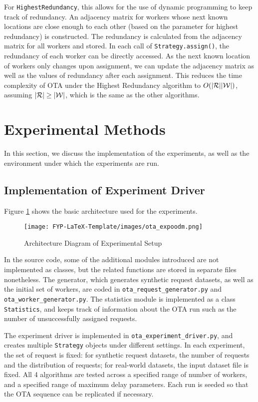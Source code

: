 \documentclass[urop]{socreport}
\begin{document}
For \verb|HighestRedundancy|, this allows for the use of dynamic programming to keep track of redundancy. An adjacency matrix for workers whose next known locations are close enough to each other (based on the parameter for highest redundancy) is constructed. The redundancy is calculated from the adjacency matrix for all workers and stored. In each call of \verb|Strategy.assign()|, the redundancy of each worker can be directly accessed. As the next known location of workers only changes upon assignment, we can update the adjacency matrix as well as the values of redundancy after each assignment. This reduces the time complexity of OTA under the Highest Redundancy algorithm to $O(|\mathcal{R}||\mathcal{W}|)$, assuming $|\mathcal{R}| \geq |\mathcal{W}|$, which is the same as the other algorithms.

\section{Experimental Methods}
In this section, we discuss the implementation of the experiments, as well as the environment under which the experiments are run.

\subsection{Implementation of Experiment Driver}
Figure \ref{fig:expdiag} shows the basic architecture used for the experiments. 

\begin{figure}[h]
    \centering
    \texttt{[image: FYP-LaTeX-Template/images/ota\_expoodm.png]}
    \caption{Architecture Diagram of Experimental Setup}
    \label{fig:expdiag}
\end{figure}

In the source code, some of the additional modules introduced are not implemented as classes, but the related functions are stored in separate files nonetheless. The generator, which generates synthetic request datasets, as well as the initial set of workers, are coded in \verb|ota_request_generator.py| and \verb|ota_worker_generator.py|. The statistics module is implemented as a class \verb|Statistics|, and keeps track of information about the OTA run such as the number of unsuccessfully assigned requests. 

The experiment driver is implemented in \verb|ota_experiment_driver.py|, and creates multiple \verb|Strategy| objects under different settings. In each experiment, the set of request is fixed: for synthetic request datasets, the number of requests and the distribution of requests; for real-world datasets, the input dataset file is fixed. All 4 algorithms are tested across a specified range of number of workers, and a specified range of maximum delay parameters. Each run is seeded so that the OTA sequence can be replicated if necessary.
\end{document}
